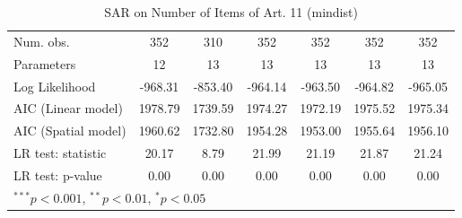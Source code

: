 \begin{table}[!h]
\begin{center}
\begin{tabular}{l c c c c c c }
\midrule
Num. obs.               & 352          & 310         & 352          & 352          & 352          & 352          \\
Parameters              & 12           & 13          & 13           & 13           & 13           & 13           \\
Log Likelihood          & -968.31      & -853.40     & -964.14      & -963.50      & -964.82      & -965.05      \\
AIC (Linear model)      & 1978.79      & 1739.59     & 1974.27      & 1972.19      & 1975.52      & 1975.34      \\
AIC (Spatial model)     & 1960.62      & 1732.80     & 1954.28      & 1953.00      & 1955.64      & 1956.10      \\
LR test: statistic      & 20.17        & 8.79        & 21.99        & 21.19        & 21.87        & 21.24        \\
LR test: p-value        & 0.00         & 0.00        & 0.00         & 0.00         & 0.00         & 0.00         \\
\bottomrule
\multicolumn{7}{l}{\scriptsize{$^{***}p<0.001$, $^{**}p<0.01$, $^*p<0.05$}}
\end{tabular}
\caption{SAR on Number of Items of Art. 11 (mindist)}
\label{table:coefficients}
\end{center}
\end{table}
